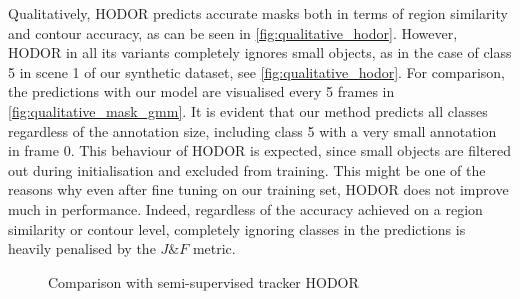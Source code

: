 Qualitatively, HODOR predicts accurate masks both in terms of region similarity and contour accuracy, as can be seen in \figref\ref{fig:qualitative_hodor}. However, HODOR in all its variants completely ignores small objects, as in the case of class 5 in scene 1 of our synthetic dataset, see \figref\ref{fig:qualitative_hodor}. For comparison, the predictions with our model are visualised every 5 frames in \figref\ref{fig:qualitative_mask_gmm}. It is evident that our method predicts all classes regardless of the annotation size, including class 5 with a very small annotation in frame 0. This behaviour of HODOR is expected, since small objects are filtered out during initialisation and excluded from training. This might be one of the reasons why even after fine tuning on our training set, HODOR does not improve much in performance. Indeed, regardless of the accuracy achieved on a region similarity or contour level, completely ignoring classes in the predictions is heavily penalised by the $J\&F$ metric.\par 


\begin{figure}[!ht]
    \hfill
    \caption{Comparison with semi-supervised tracker HODOR
    }
    \label{fig:qualitative_hodor_all}
\end{figure}



